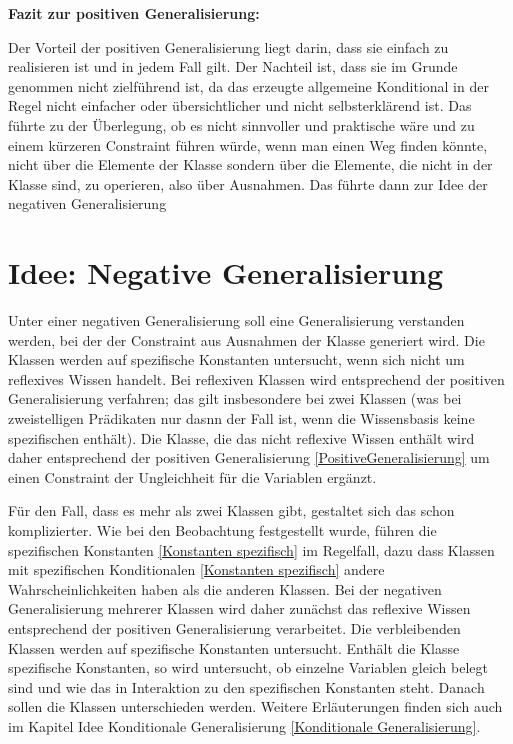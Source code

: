 \documentclass[draft]{scrreprt}
\begin{document}
\textbf{{\large Fazit zur positiven Generalisierung:}}\label{Fazit pos Gen} 

\noindent
Der Vorteil der positiven Generalisierung liegt darin, dass sie einfach zu realisieren ist und in jedem Fall gilt. Der Nachteil ist, dass sie im Grunde genommen nicht zielführend ist, da das erzeugte allgemeine Konditional in der Regel nicht einfacher oder übersichtlicher und nicht selbsterklärend ist. Das führte zu der Überlegung, ob es nicht sinnvoller und praktische wäre und zu einem kürzeren Constraint führen würde, wenn man einen Weg finden könnte, nicht über die Elemente der Klasse sondern über die Elemente, die nicht in der Klasse sind, zu operieren,  also über Ausnahmen. Das führte dann zur Idee der negativen Generalisierung 

\section{Idee: Negative Generalisierung}
\label{NegativeGeneralisierung}
Unter einer negativen Generalisierung soll eine Generalisierung verstanden werden, bei der der Constraint aus Ausnahmen der Klasse generiert wird. Die Klassen werden auf spezifische Konstanten untersucht, wenn sich nicht um reflexives Wissen handelt. Bei reflexiven Klassen wird entsprechend der positiven Generalisierung verfahren; das gilt insbesondere bei zwei Klassen (was bei zweistelligen Prädikaten nur dasnn der Fall ist, wenn die Wissensbasis keine spezifischen enthält). Die Klasse, die das nicht reflexive Wissen enthält wird daher entsprechend der positiven Generalisierung \ref{PositiveGeneralisierung} um einen Constraint der Ungleichheit für die Variablen ergänzt.


Für den Fall, dass es mehr als zwei Klassen gibt, gestaltet sich das schon komplizierter. Wie bei den Beobachtung festgestellt wurde, führen die spezifischen Konstanten \ref{Konstanten spezifisch} im Regelfall, dazu dass Klassen mit spezifischen Konditionalen \ref{Konstanten spezifisch} andere Wahrscheinlichkeiten haben als die anderen Klassen. Bei der negativen Generalisierung mehrerer Klassen wird daher zunächst das reflexive Wissen entsprechend der positiven Generalisierung verarbeitet. Die verbleibenden Klassen werden auf spezifische Konstanten untersucht. Enthält die Klasse spezifische Konstanten, so wird untersucht, ob einzelne Variablen gleich belegt sind und wie das in Interaktion zu den spezifischen Konstanten steht. Danach sollen die Klassen unterschieden werden. Weitere Erläuterungen finden sich auch im Kapitel Idee Konditionale Generalisierung \ref{Konditionale Generalisierung}. \\
\end{document}
